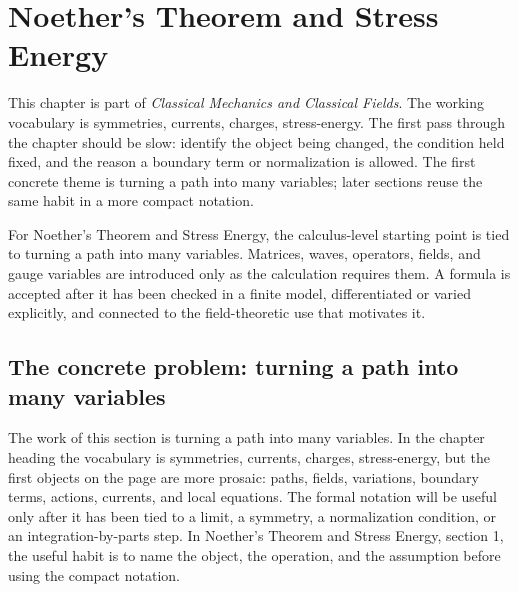 \chapter{Noether's Theorem and Stress Energy}


This chapter is part of \emph{Classical Mechanics and Classical Fields}.  The working vocabulary is symmetries, currents, charges, stress-energy.  The first pass through the chapter should be slow: identify the object being changed, the condition held fixed, and the reason a boundary term or normalization is allowed.  The first concrete theme is turning a path into many variables; later sections reuse the same habit in a more compact notation.

For Noether's Theorem and Stress Energy, the calculus-level starting point is tied to turning a path into many variables.  Matrices, waves, operators, fields, and gauge variables are introduced only as the calculation requires them.  A formula is accepted after it has been checked in a finite model, differentiated or varied explicitly, and connected to the field-theoretic use that motivates it.

\section{The concrete problem: turning a path into many variables}













The work of this section is turning a path into many variables.  In the chapter heading the vocabulary is symmetries, currents, charges, stress-energy, but the first objects on the page are more prosaic: paths, fields, variations, boundary terms, actions, currents, and local equations.  The formal notation will be useful only after it has been tied to a limit, a symmetry, a normalization condition, or an integration-by-parts step.  In Noether's Theorem and Stress Energy, section 1, the useful habit is to name the object, the operation, and the assumption before using the compact notation.

